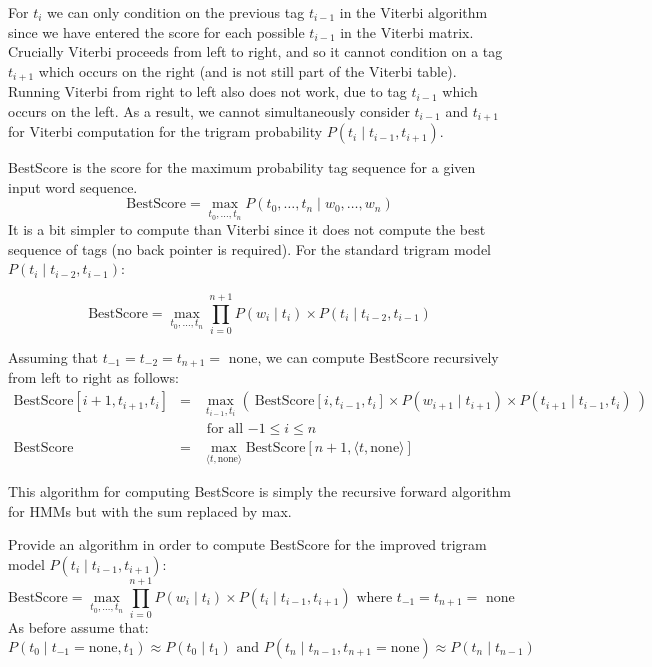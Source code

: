 \documentclass[11pt]{article}
\begin{document}
\begin{exe}
\begin{xlist}
{\begin{soln}
For $t_i$ we can only condition on the previous tag $t_{i-1}$ in the Viterbi algorithm 
since we have entered the score for each possible $t_{i-1}$ in the Viterbi matrix. 
Crucially Viterbi proceeds from left to right, and so it cannot condition on a
tag $t_{i+1}$ which occurs on the right (and is not still part of the Viterbi table). 
Running Viterbi from right to left also does not work, 
due to tag $t_{i-1}$ which occurs on the left. As a result, we cannot simultaneously consider 
$t_{i-1}$ and $t_{i+1}$ for Viterbi computation for the trigram probability
$P(t_i \mid t_{i-1}, t_{i+1})$.

\end{soln}
}

\bigskip

{\ex 
BestScore is the score for the maximum probability tag sequence for a given input word sequence. 
\[ \textrm{BestScore} = \max\limits_{t_0, \ldots, t_n} P(t_0, \ldots, t_n \mid w_0,
\ldots, w_n) \]
It
is a bit simpler to compute than Viterbi since it does not
compute the best sequence of tags (no back pointer is required). For the standard
trigram model $P(t_i \mid  t_{i-2}, t_{i-1})$:

\[ \textrm{BestScore} = \max\limits_{t_0, \ldots, t_n} \prod_{i=0}^{n+1} P(w_i \mid t_i) \times P(t_i \mid  t_{i-2}, t_{i-1}) \]

Assuming that $t_{-1} = t_{-2} = t_{n+1} = $ none, we can compute BestScore recursively from left to right as follows:
\begin{eqnarray*}
\textrm{BestScore}[i+1, t_{i+1}, t_i] & = & \max_{t_{i-1}, t_i} \left(\ 
\textrm{BestScore}[i, t_{i-1}, t_{i}] \times P(w_{i+1} \mid t_{i+1}) \times P(t_{i+1} \mid t_{i-1}, t_i) \ \right) \\
&& \textrm{ for all $-1 \leq i \leq n$ } \\
\textrm{BestScore} &=& \max\limits_{\langle t, \textrm{none} \rangle} \textrm{BestScore}[n+1, \langle t, \textrm{none} \rangle] 
\end{eqnarray*}

This algorithm for computing BestScore is simply the recursive forward algorithm for HMMs but with the sum replaced by max. 

Provide an algorithm 
 in order to compute BestScore for the improved trigram model $P(t_i \mid t_{i-1}, t_{i+1})$:
 \[ \textrm{BestScore} = \max\limits_{t_0, \ldots, t_n} \prod_{i=0}^{n+1} P(w_i \mid t_i) \times P(t_i \mid t_{i-1}, t_{i+1})
\textrm{ where $t_{-1} = t_{n+1} = $ none } \]
As before assume
that:
\( P(t_0 \mid t_{-1} = \textrm{none}, t_1) \approx P(t_0 \mid t_1) \textrm{ and } P(t_n \mid t_{n-1}, t_{n+1} = \textrm{none}) \approx P(t_n \mid t_{n-1}) \)

}
\end{xlist}
\end{exe}
\end{document}
